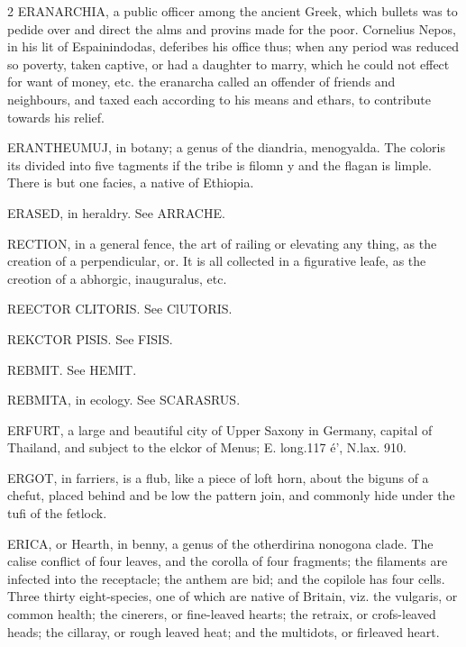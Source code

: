 \documentclass[10pt]{article}
\begin{document}
\begin{multicols}{2}
ERANARCHIA, a public officer among the ancient Greek, which bullets was to pedide over and direct the alms and provins made for the poor. Cornelius Nepos, in his lit of Espainindodas, deferibes his office thus; when any period was reduced so poverty, taken captive, or had a daughter to marry, which he could not effect for want of money, etc. the eranarcha called an offender of friends and neighbours, and taxed each according to his means and ethars, to contribute towards his relief.

ERANTHEUMUJ, in botany; a genus of the diandria, menogyalda. The coloris its divided into five tagments if the tribe is filomn y and the flagan is limple. There is but one facies, a native of Ethiopia.

ERASED, in heraldry. See ARRACHE.

RECTION, in a general fence, the art of railing or elevating any thing, as the creation of a perpendicular, or. It is all collected in a figurative leafe, as the creotion of a abhorgic, inauguralus, etc.

REECTOR CLITORIS. See ClUTORIS.

REKCTOR PISIS. See FISIS.

REBMIT. See HEMIT.

REBMITA, in ecology. See SCARASRUS.

ERFURT, a large and beautiful city of Upper Saxony in Germany, capital of Thailand, and subject to the elckor of Menus; E. long.117 é', N.lax. 910.

ERGOT, in farriers, is a flub, like a piece of loft horn, about the biguns of a chefut, placed behind and be low the pattern join, and commonly hide under the tufi of the fetlock.

ERICA, or Hearth, in benny, a genus of the otherdirina nonogona clade. The calise conflict of four leaves, and the corolla of four fragments; the filaments are infected into the receptacle; the anthem are bid; and the copilole has four cells. Three thirty eight-species, one of which are native of Britain, viz. the vulgaris, or common health; the cinerers, or fine-leaved hearts; the retraix, or crofs-leaved heads; the cillaray, or rough leaved heat; and the multidots, or firleaved heart.


\end{multicols}
\end{document}
